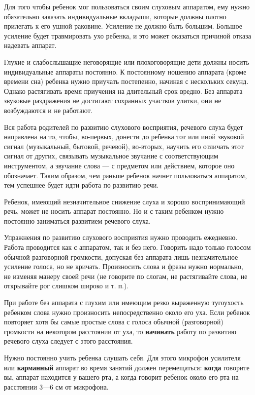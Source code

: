 \documentclass{book}
\begin{document}
Для того чтобы ребенок мог пользоваться своим слуховым аппаратом, ему
нужно обязательно заказать индивидуальные вкладыши, которые должны
плотно прилегать к его ушной раковине. Усиление не должно быть большим.
Большое усиление будет травмировать ухо ребенка, и это может оказаться
причиной отказа надевать аппарат.

Глухие и слабослышащие неговорящие или плохоговорящие дети должны носить
индивидуальные аппараты постоянно. К постоянному ношению аппарата (кроме
времени сна) ребенка нужно приучать постепенно, начиная с нескольких
секунд. Однако растягивать время приучения на длительный срок вредно.
Без аппарата звуковые раздражения не достигают сохранных участков
улитки, они не возбуждаются и не работают.

Вся работа родителей по развитию слухового восприятия, речевого слуха
будет направлена на то, чтобы, во-первых, донести до ребенка тот или
иной звуковой сигнал (музыкальный, бытовой, речевой), во-вторых, научить
его отличать этот сигнал от других, связывать музыкальное звучание с
соответствующим инструментом, а звучание слова --- с предметом или
действием, которое оно обозначает. Таким образом, чем раньше ребенок
начнет пользоваться аппаратом, тем успешнее будет идти работа по
развитию речи.

Ребенок, имеющий незначительное снижение слуха и хорошо воспринимающий
речь, может не носить аппарат постоянно. Но и с таким ребенком нужно
постоянно заниматься развитием речевого слуха.

Упражнения по развитию слухового восприятия нужно проводить ежедневно.
Работа проводится как с аппаратом, так и без него. Говорить надо только
голосом обычной разговорной громкости, допуская без аппарата лишь
незначительное усиление голоса, но не кричать. Произносить слова и фразы
нужно нормально, не изменяя манеру своей речи (не говорите по слогам, не
растягивайте слова, не открывайте рог слишком широко и т. п.).

При работе без аппарата с глухим или имеющим резко выраженную тугоухость
ребенком слова нужно произносить непосредственно около его уха. Если
ребенок повторяет хотя бы самые простые слова с голоса обычной
(разговорной) громкости на некотором расстоянии от уха, то
\textbf{начинать} работу по развитию речевого слуха следует с этого
расстояния.

Нужно постоянно учить ребенка слушать себя. Для этого микрофон усилителя
или \textbf{карманный} аппарат во время занятий должен перемещаться:
\textbf{когда} говорите вы, аппарат находится у вашего рта, а когда
говорит ребенок около его рта на расстоянии 3---6 см от микрофона.
\end{document}

